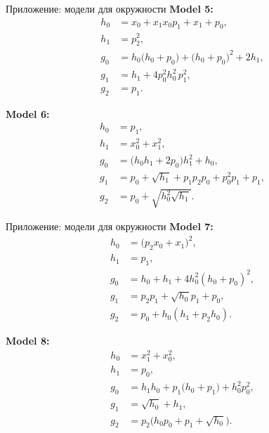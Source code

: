 \documentclass{beamer}
\begin{document}
\begin{frame}{Приложение: модели для окружности}
    \textbf{Model 5:}
    \begin{align*}
    h_0 &= x_0 + x_1x_0p_1 + x_1 + p_0,\\
    h_1 &= p_2^2,\\
    g_0 &= h_0\bigl(h_0 + p_0\bigr) + \bigl(h_0 + p_0\bigr)^2 + 2h_1,\\
    g_1 &= h_1 + 4p_0^2h_0^2\,p_1^2,\\
    g_2 &= p_1.
    \end{align*}

    \textbf{Model 6:}
    \begin{align*}
    h_0 &= p_1,\\
    h_1 &= x_0^2 + x_1^2,\\
    g_0 &= \bigl(h_0h_1 + 2p_0\bigr)h_1^2 + h_0,\\
    g_1 &= p_0 + \sqrt{h_1} + p_1p_2p_0 + p_0^2p_1 + p_1,\\
    g_2 &= p_0 + \sqrt{h_0^2\sqrt{h_1}}.
    \end{align*}
\end{frame}
\begin{frame}{Приложение: модели для окружности}
    \textbf{Model 7:}
    \begin{align*}
    h_0 &= \bigl(p_2x_0 + x_1\bigr)^2,\\
    h_1 &= p_1,\\
    g_0 &= h_0 + h_1 + 4h_0^2(h_0 + p_0)^2,\\
    g_1 &= p_2p_1 + \sqrt{h_0}p_1 + p_0,\\
    g_2 &= p_0 + h_0(h_1 + p_2h_0).
    \end{align*}
    
    \textbf{Model 8:}
    \begin{align*}
    h_0 &= x_1^2 + x_0^2,\\
    h_1 &= p_0,\\
    g_0 &= h_1h_0 + p_1\bigl(h_0 + p_1\bigr) + h_0^2p_0^2,\\
    g_1 &= \sqrt{h_0} + h_1,\\
    g_2 &= p_2\bigl(h_0p_0 + p_1 + \sqrt{h_0}\bigr).
    \end{align*}
\end{frame}
\end{document}
